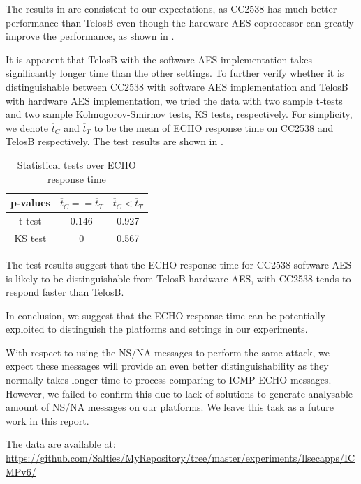 The results in  are consistent to our expectations, as CC2538 has much better performance than TelosB even though the hardware AES coprocessor can greatly improve the performance, as shown in .

It is apparent that TelosB with the software AES implementation takes significantly longer time than the other settings. To further verify whether it is distinguishable between CC2538 with software AES implementation and TelosB with hardware AES implementation, we tried the data with two sample t-tests and two sample Kolmogorov-Smirnov tests, KS tests, respectively. For simplicity, we denote $\overline{t}_C$ and $\overline{t}_T$ to be the mean of ECHO response time on CC2538 and TelosB respectively. The test results are shown in .

\begin{table}[ht!]
	\center
	\begin{tabular}{|c|c|c|}
	\hline
	 p-values       & $\overline{t}_C == \overline{t}_T$ & $\overline{t}_C < \overline{t}_T$ \\ \hline
	t-test  & 0.146        & 0.927       \\ \hline
	KS test & 0            & 0.567       \\ \hline
	\end{tabular}
	\caption{Statistical tests over ECHO response time}
	\label{Tbl: Statistical tests over ECHO response time}
\end{table}

The test results suggest that the ECHO response time for CC2538 software AES is likely to be distinguishable from TelosB hardware AES, with CC2538 tends to respond faster than TelosB.

In conclusion, we suggest that the ECHO response time can be potentially exploited to distinguish the platforms and settings in our experiments.

With respect to using the NS/NA messages to perform the same attack, we expect these messages will provide an even better distinguishability as they normally takes longer time to process comparing to ICMP ECHO messages. However, we failed to confirm this due to lack of solutions to generate analysable amount of NS/NA messages on our platforms. We leave this task as a future work in this report.

The data are available at: \\
\url{https://github.com/Salties/MyRepository/tree/master/experiments/llsecapps/ICMPv6/}

